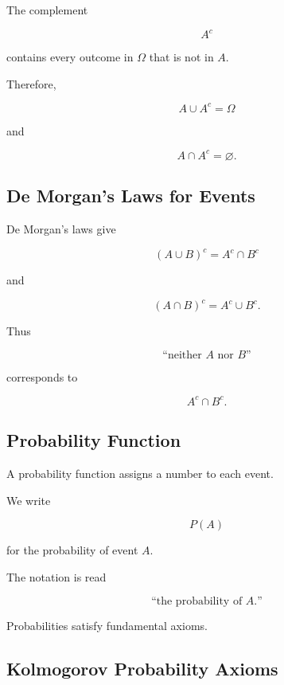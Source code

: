 The complement

\[
\boxed{
A^c
}
\]

contains every outcome in \(\Omega\) that is not in \(A\).

Therefore,

\[
A\cup A^c=\Omega
\]

and

\[
A\cap A^c=\varnothing.
\]

\subsection{De Morgan's Laws for Events}
\label{subsec:demorgan-probability}

De Morgan's laws give

\[
\boxed{
(A\cup B)^c
=
A^c\cap B^c
}
\]

and

\[
\boxed{
(A\cap B)^c
=
A^c\cup B^c.
}
\]

Thus

\[
\text{``neither \(A\) nor \(B\)''}
\]

corresponds to

\[
A^c\cap B^c.
\]

\subsection{Probability Function}
\label{subsec:probability-function}

A probability function assigns a number to each event.

We write

\[
\boxed{
P(A)
}
\]

for the probability of event \(A\).

The notation is read

\[
\text{``the probability of \(A\).''}
\]

Probabilities satisfy fundamental axioms.

\subsection{Kolmogorov Probability Axioms}
\label{subsec:probability-axioms}

